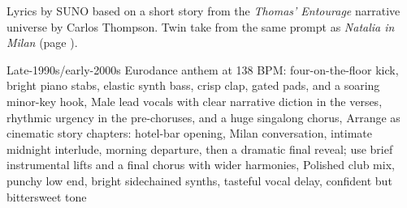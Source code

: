 
\label{sec:a-night-to-remember}
\begin{notes}
Lyrics by SUNO based on a short story from the \emph{Thomas’ Entourage} narrative universe by Carlos Thompson. Twin take from the same prompt as \emph{Natalia in Milan} (page \pageref{sec:natalia-in-milan}).
\end{notes}
\begin{style}
Late-1990s/early-2000s Eurodance anthem at 138 BPM: four-on-the-floor kick, bright piano stabs, elastic synth bass, crisp clap, gated pads, and a soaring minor-key hook, Male lead vocals with clear narrative diction in the verses, rhythmic urgency in the pre-choruses, and a huge singalong chorus, Arrange as cinematic story chapters: hotel-bar opening, Milan conversation, intimate midnight interlude, morning departure, then a dramatic final reveal; use brief instrumental lifts and a final chorus with wider harmonies, Polished club mix, punchy low end, bright sidechained synths, tasteful vocal delay, confident but bittersweet tone
\end{style}
